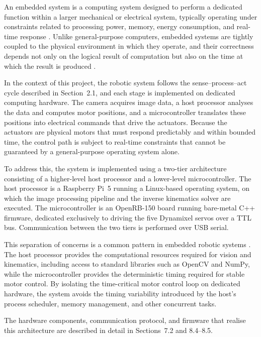 
An embedded system is a computing system designed to perform a 
dedicated function within a larger mechanical or electrical system, 
typically operating under constraints related to processing power, 
memory, energy consumption, and real-time response \cite{marwedel2021}. 
Unlike general-purpose computers, embedded systems are tightly coupled 
to the physical environment in which they operate, and their correctness 
depends not only on the logical result of computation but also on the 
time at which the result is produced \cite{lee2017}.

In the context of this project, the robotic system follows the 
sense--process--act cycle described in Section~2.1, and each stage is 
implemented on dedicated computing hardware. The camera acquires image 
data, a host processor analyses the data and computes motor positions, 
and a microcontroller translates these positions into electrical 
commands that drive the actuators. Because the actuators are physical 
motors that must respond predictably and within bounded time, the 
control path is subject to real-time constraints that cannot be 
guaranteed by a general-purpose operating system alone.

To address this, the system is implemented using a two-tier 
architecture consisting of a higher-level host processor and a 
lower-level microcontroller. The host processor is a Raspberry Pi~5 
running a Linux-based operating system, on which the image processing 
pipeline and the inverse kinematics solver are executed. The 
microcontroller is an OpenRB-150 board running bare-metal C++ firmware, 
dedicated exclusively to driving the five Dynamixel servos over a TTL 
bus. Communication between the two tiers is performed over USB serial.

This separation of concerns is a common pattern in embedded robotic 
systems \cite{lee2017}. The host processor provides the computational 
resources required for vision and kinematics, including access to 
standard libraries such as OpenCV and NumPy, while the microcontroller 
provides the deterministic timing required for stable motor control. 
By isolating the time-critical motor control loop on dedicated hardware, 
the system avoids the timing variability introduced by the host's 
process scheduler, memory management, and other concurrent tasks.

The hardware components, communication protocol, and firmware that 
realise this architecture are described in detail in Sections~7.2 
and 8.4--8.5.